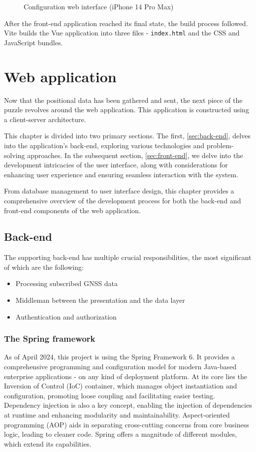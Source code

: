 \documentclass[FM,BP,EN,fonts]{tulthesis}
\begin{document}
\begin{figure}[ht]
    \caption{Configuration web interface (iPhone 14 Pro Max)}
    \label{fig:config-interface-esp}
\end{figure}

After the front-end application reached its final state, the build process followed. Vite builds the Vue application into three files - \verb|index.html| and the CSS and JavaScript bundles.

\chapter{Web application}
\label{chap:application}
Now that the positional data has been gathered and sent, the next piece of the puzzle revolves around the web application. This application is constructed using a client-server architecture. 

This chapter is divided into two primary sections. The first, \autoref{sec:back-end}, delves into the application's back-end, exploring various technologies and problem-solving approaches. In the subsequent section, \autoref{sec:front-end}, we delve into the development intricacies of the user interface, along with considerations for enhancing user experience and ensuring seamless interaction with the system. 

From database management to user interface design, this chapter provides a comprehensive overview of the development process for both the back-end and front-end components of the web application.

\section{Back-end}
\label{sec:back-end}
The supporting back-end has multiple crucial responsibilities, the most significant of which are the following:

\begin{itemize}
    \item Processing subscribed GNSS data 
    \item Middleman between the presentation and the data layer
    \item Authentication and authorization
\end{itemize}

\subsection{The Spring framework}
As of April 2024, this project is using the Spring Framework 6. It provides a comprehensive programming and configuration model for modern Java-based enterprise applications - on any kind of deployment platform. At its core lies the Inversion of Control (IoC) container, which manages object instantiation and configuration, promoting loose coupling and facilitating easier testing. Dependency injection is also a key concept, enabling the injection of dependencies at runtime and enhancing modularity and maintainability. Aspect-oriented programming (AOP) aids in separating cross-cutting concerns from core business logic, leading to cleaner code. Spring offers a magnitude of different modules, which extend its capabilities.
\end{document}
